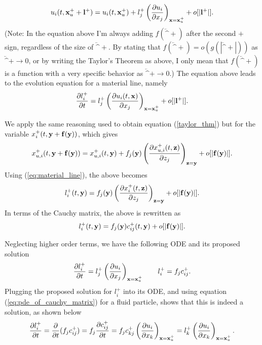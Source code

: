 \documentclass[oneside,a4paper,11pt]{report}
\begin{document}
\begin{equation}
\label{taylor_thm}
u_i(t,\mathbf{x}^+_u + \mathbf{l}^+) = u_i(t,\mathbf{x}^+_u) + l_j^+\left ( \frac{\partial u_i}{\partial x_j} \right )_{\mathbf{x} = \mathbf{x}^+_u} +o[|\mathbf{l}^+|].
\end{equation} 
(Note: In the equation above I'm always adding $f(\lvec^+)$ after the second $+$ sign, regardless of the size of $\lvec^+$. By stating that $f(\lvec^+) = o(g(|\lvec^+|))$ as $\lvec^+ \to 0$, or by writing the Taylor's Theorem as above, I only mean that $f(\lvec^+)$ is a function with a very specific behavior as $\lvec^+ \to 0$.)
The equation above leads to the evolution equation for a material line, namely
\begin{equation}
\frac{\partial l_i^+}{\partial t} = l_j^+ \left ( \frac{\partial u_i(t,\mathbf{x})}{\partial x_j} \right )_{\mathbf{x} = \mathbf{x}^+_u} + o[|\mathbf{l}^+|].
\end{equation}

We apply the same reasoning used to obtain equation (\ref{taylor_thm}) but for the variable $x_i^+(t,\mathbf{y} + \mathbf{f}(\mathbf{y}))$, which gives
\begin{equation}
    x_{u,i}^+(t,\mathbf{y} + \mathbf{f}(\mathbf{y})) = x_{u,i}^+(t,\mathbf{y}) + f_j (\mathbf{y}) \left ( \frac{\partial x_{u,i}^+(t,\mathbf{z}) }{\partial z_j} \right)_{\mathbf{z} = \mathbf{y}} + o[|\mathbf{f}(\mathbf{y})|].
\end{equation}
Using (\cref{eq:material_line}), the above becomes
\begin{equation}
l^+_i(t,\mathbf{y}) = f_j(\mathbf{y}) \left ( \frac{\partial x_i^+(t,\mathbf{z})}{\partial z_j} \right )_{\mathbf{z} = \mathbf{y}} + o[|\mathbf{f}( \mathbf{y})|].
\end{equation}
In terms of the Cauchy matrix, the above is rewritten as
\begin{equation}
l^+_i(t,\mathbf{y}) = f_j(\mathbf{y})c^+_{ij}(t,\mathbf{y}) + o[|\mathbf{f}( \mathbf{y})|].
\end{equation}

Neglecting higher order terms, we have the following ODE and its proposed solution
\begin{equation}
\label{eq:material_line_eqs}
\frac{\partial l_i^+}{\partial t} = l_j^+ \left ( \frac{\partial u_i}{\partial x_j} \right )_{\mathbf{x} = \mathbf{x}^+_u} \qquad l^+_i = f_j c^+_{ij}.
\end{equation}
Plugging the proposed solution for $l_i^+$ into its ODE, and using equation (\ref{eq:pde_of_cauchy_matrix}) for a fluid particle, shows that this is indeed a solution, as shown below
\begin{equation}
\frac{\partial l_i^+}{\partial t} = \frac{\partial}{\partial t}  ( f_j c^+_{ij} ) 
= f_j \frac{\partial c^+_{ij}}{\partial t}
= f_j c^+_{kj} \left ( \frac{\partial u_i}{\partial x_k} \right )_{\mathbf{x}=\mathbf{x}^+_u} 
= l_k^+ \left ( \frac{\partial u_i}{\partial x_k} \right )_{\mathbf{x} = \mathbf{x}^+_u}.
\end{equation}
\end{document}
